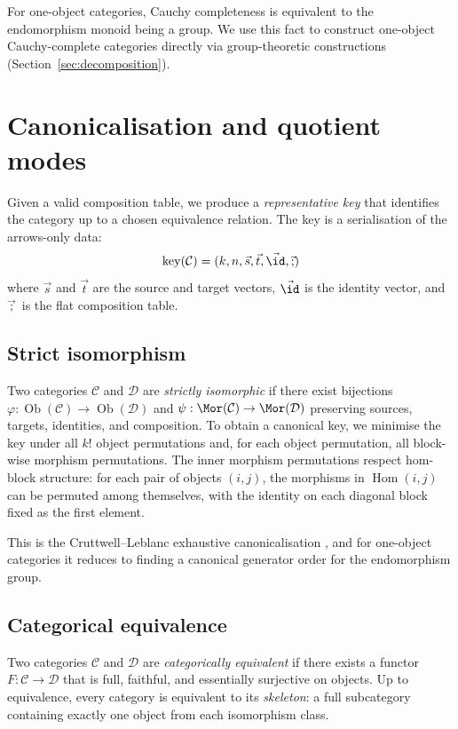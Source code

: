 \documentclass[12pt,a4paper]{amsart}
\theoremstyle{definition}
\theoremstyle{remark}
\newcommand{\cat}{\mathcal}
\newcommand{\Ob}{\operatorname{Ob}}
\newcommand{\Hom}{\operatorname{Hom}}
\begin{document}
For one-object categories, Cauchy completeness is equivalent to the
endomorphism monoid being a group.  We use this fact to construct
one-object Cauchy-complete categories directly via group-theoretic
constructions (Section~\ref{sec:decomposition}).

\section{Canonicalisation and quotient modes}
\label{sec:canonical}

Given a valid composition table, we produce a \emph{representative key}
that identifies the category up to a chosen equivalence relation.  The
key is a serialisation of the arrows-only data:
\[
\operatorname{key}(\cat{C}) = (k, n, \vec{s}, \vec{t}, \vec{\id}, \vec{;})
\]
where $\vec{s}$ and $\vec{t}$ are the source and target vectors,
$\vec{\id}$ is the identity vector, and $\vec{;}$ is the flat composition
table.

\subsection{Strict isomorphism}

Two categories $\cat{C}$ and $\cat{D}$ are \emph{strictly isomorphic}
if there exist bijections $\varphi : \Ob(\cat{C}) \to \Ob(\cat{D})$ and
$\psi : \Mor(\cat{C}) \to \Mor(\cat{D})$ preserving sources, targets,
identities, and composition.  To obtain a canonical key, we minimise the
key under all $k!$ object permutations and, for each object permutation,
all block-wise morphism permutations.  The inner morphism permutations
respect hom-block structure: for each pair of objects $(i,j)$, the
morphisms in $\Hom(i,j)$ can be permuted among themselves, with the
identity on each diagonal block fixed as the first element.

This is the Cruttwell--Leblanc exhaustive canonicalisation
\cite{cruttwell2014}, and for one-object categories it reduces to finding
a canonical generator order for the endomorphism group.

\subsection{Categorical equivalence}

Two categories $\cat{C}$ and $\cat{D}$ are \emph{categorically equivalent}
if there exists a functor $F : \cat{C} \to \cat{D}$ that is full, faithful,
and essentially surjective on objects.  Up to equivalence, every category
is equivalent to its \emph{skeleton}: a full subcategory containing exactly
one object from each isomorphism class.
\end{document}

